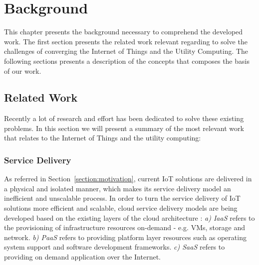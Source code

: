
\chapter{Background}
\label{chapter:background}
This chapter presents the background necessary to comprehend the developed work. The first section
presents the related work relevant regarding to solve the challenges of converging the Internet of
Things and the Utility Computing. The following sections presents a description of the concepts
that composes the basis of our work.

\section{Related Work}
\label{section:related_work}
Recently a lot of research and effort has been dedicated to solve these existing problems. In this
section we will present a summary of the most relevant work that relates to the Internet of Things and the utility computing:

\subsection{Service Delivery}
\label{sub:service_delivery}
As referred in Section~\ref{section:motivation}, current \gls{IoT} solutions are delivered in a physical
and isolated manner, which makes its service delivery model an inefficient and unscalable process.
In order to turn the service delivery of \gls{IoT} solutions more efficient and scalable, cloud service
delivery models are being developed based on the existing layers of the cloud architecture \cite{zhang2010cloud}:
\textit{a) \gls{IaaS}} refers to the provisioning of infrastructure resources on-demand - e.g. \glspl{VM},
storage and network. \textit{b) \gls{PaaS}} refers to providing platform layer resources such as operating
system support and software development frameworks. \textit{c) \gls{SaaS}} refers to providing on demand
application over the Internet.

